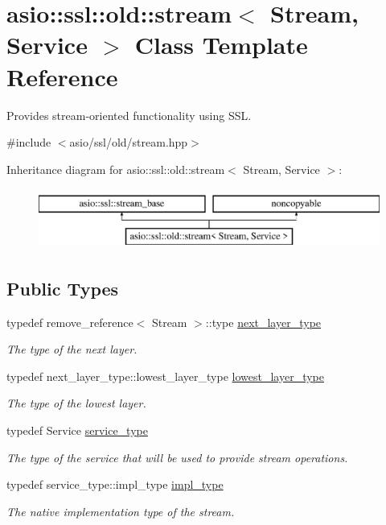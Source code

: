 \hypertarget{classasio_1_1ssl_1_1old_1_1stream}{}\section{asio\+:\+:ssl\+:\+:old\+:\+:stream$<$ Stream, Service $>$ Class Template Reference}
\label{classasio_1_1ssl_1_1old_1_1stream}


Provides stream-\/oriented functionality using S\+S\+L.  




{\ttfamily \#include $<$asio/ssl/old/stream.\+hpp$>$}

Inheritance diagram for asio\+:\+:ssl\+:\+:old\+:\+:stream$<$ Stream, Service $>$\+:\begin{figure}[H]
\begin{center}
\leavevmode
\includegraphics[height=2.000000cm]{classasio_1_1ssl_1_1old_1_1stream}
\end{center}
\end{figure}
\subsection*{Public Types}
\begin{DoxyCompactItemize}
\item 
typedef remove\+\_\+reference$<$ Stream $>$\+::type \hyperlink{classasio_1_1ssl_1_1old_1_1stream_a71ae7adcbd44cae6750157541c2ddf8e}{next\+\_\+layer\+\_\+type}
\begin{DoxyCompactList}\small\item\em The type of the next layer. \end{DoxyCompactList}\item 
typedef next\+\_\+layer\+\_\+type\+::lowest\+\_\+layer\+\_\+type \hyperlink{classasio_1_1ssl_1_1old_1_1stream_a6b664149066b698269db4e2f4e846ca2}{lowest\+\_\+layer\+\_\+type}
\begin{DoxyCompactList}\small\item\em The type of the lowest layer. \end{DoxyCompactList}\item 
typedef Service \hyperlink{classasio_1_1ssl_1_1old_1_1stream_a2e027ffad5f6a2acd99689211e717ac5}{service\+\_\+type}
\begin{DoxyCompactList}\small\item\em The type of the service that will be used to provide stream operations. \end{DoxyCompactList}\item 
typedef service\+\_\+type\+::impl\+\_\+type \hyperlink{classasio_1_1ssl_1_1old_1_1stream_a965fd8deeebbf308d18fbac925009d8d}{impl\+\_\+type}
\begin{DoxyCompactList}\small\item\em The native implementation type of the stream. \end{DoxyCompactList}\end{DoxyCompactItemize}

